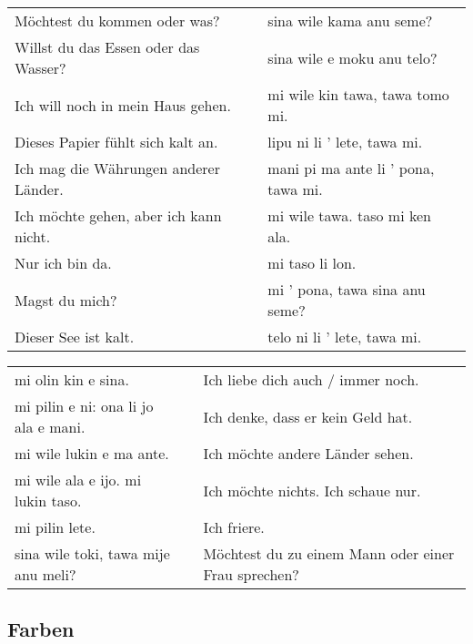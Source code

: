 \begin{supertabular}{p{5,5cm}|ll}
Möchtest du kommen oder was?  && sina wile kama anu seme? \\ %
Willst du das Essen oder das Wasser?  && sina wile e moku anu telo? \\ %
Ich will noch in mein Haus gehen.  && mi wile kin tawa, tawa tomo mi. \\ %
Dieses Papier fühlt sich kalt an.  && lipu ni li ' lete, tawa mi. \\ %
Ich mag die Währungen anderer Länder.  && mani pi ma ante li ' pona, tawa mi. \\ %
Ich möchte gehen, aber ich kann nicht.  && mi wile tawa. taso mi ken ala. \\ %
Nur ich bin da. && mi taso li lon. \\ %
Magst du mich?  && mi ' pona, tawa sina anu seme? \\ %
Dieser See ist kalt. && telo ni li ' lete, tawa mi. \\ %
\end{supertabular}  

\begin{supertabular}{p{5,5cm}|ll}
mi olin kin e sina.  && Ich liebe dich auch / immer noch.\\
mi pilin e ni: ona li jo ala e mani.  && Ich denke, dass er kein Geld hat. \\
mi wile lukin e ma ante.  && Ich möchte andere Länder sehen. \\
mi wile ala e ijo. mi lukin taso.  && Ich möchte nichts. Ich schaue nur. \\
mi pilin lete.  && Ich friere. \\
sina wile toki, tawa mije anu meli?  && Möchtest du zu einem Mann oder einer Frau sprechen? \\
\end{supertabular} 

\newpage
%
\subsection*{Farben} 
\label{'colors'}

